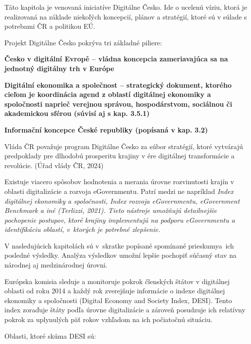 Táto kapitola je venovaná iniciatíve Digitálne Česko. Ide o ucelenú víziu, ktorá je realizovaná na základe niekoľých koncepcií, plánov a stratégií, ktoré sú v súlade s potrebami ČR a politikou EÚ.

Projekt Digitálne Česko pokrýva tri základné piliere:
\startitemize
\item{\start \bf Česko v digitální Evropě \stop -- vládna koncepcia zameriavajúca sa na jednotný digitálny trh v Európe} 
\item{\start \bf Digitální ekonomika a společnost \stop -- strategický dokument, ktorého cieľom je koordinácia agend z oblastí digitálnej ekonomiky a spoločnosti naprieč verejnou správou, hospodárstvom, sociálnou či akademickou sférou (súvisí aj s kap. 3.5.1)}
\item{\start \bf Informační koncepce České republiky \stop (popísaná v kap. 3.2)}
\stopitemize

Vláda ČR považuje program Digitálne Česko za súbor stratégií, ktoré vytvárajú predpoklady pre dlhodobú prosperitu krajiny v ére digitálnej transformácie a revolúcie. (Úřad vlády ČR, 2024)


Existuje viacero spôsobov hodnotenia a merania úrovne rozvinutosti krajín v oblasti digitalizácie a rozvoja eGovernmentu. Patrí medzi ne napríklad \start \it Index digitálnej ekonomiky a spoločnosti, Index rozvoja eGovernmentu, eGovernment Benchmark \stop a iné \scr(Terlizzi, 2021). Tieto nástroje umožňujú detailnejšie pochopenie postupov, ktoré krajiny implementujú na podporu eGovernmentu a identifikáciu oblastí, v~ktorých je potrebné zlepšenie.

V nasledujúcich kapitolách sú v~skratke popísané spomínané prieskumy\zlom a~ich posledné výsledky. Analýza výsledkov umožní lepšie pochopiť súčasný stav na národnej aj medzinárodnej úrovni.

Európska komisia sleduje a monitoruje pokrok členských štátov v digitálnej oblasti od roku 2014 a každý rok zverejňuje informácie o indexe digitálnej ekonomiky a spoločnosti (Digital Economy and Society Index, DESI). Tento index zoraďuje štáty podľa úrovne digitalizácie a zároveň posudzuje ich relatívny pokrok za uplynulých päť rokov vzhľadom na ich počiatočnú situáciu.

\blank
Oblasti, ktoré skúma DESI sú:


